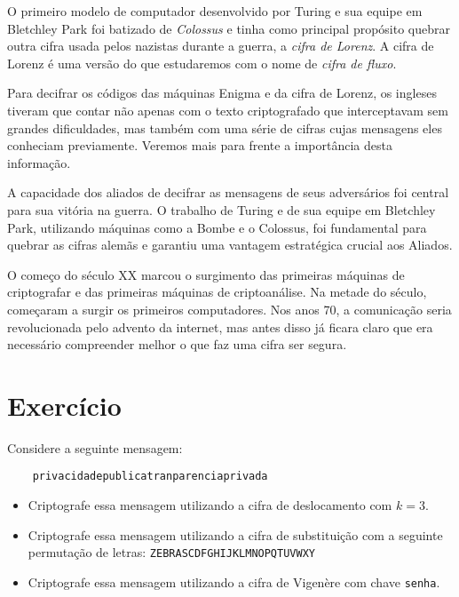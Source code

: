O primeiro modelo de computador desenvolvido por Turing e sua equipe em Bletchley Park foi batizado de {\em Colossus} e tinha como principal propósito quebrar outra cifra usada pelos nazistas durante a guerra, a {\em cifra de Lorenz}.
A cifra de Lorenz é uma versão do que estudaremos com o nome de {\em cifra de fluxo}.

Para decifrar os códigos das máquinas Enigma e da cifra de Lorenz, os ingleses tiveram que contar não apenas com o texto criptografado que interceptavam sem grandes dificuldades, mas também com uma série de cifras cujas mensagens eles conheciam previamente.
Veremos mais para frente a importância desta informação.

A capacidade dos aliados de decifrar as mensagens de seus adversários foi central para sua vitória na guerra.
O trabalho de Turing e de sua equipe em Bletchley Park, utilizando máquinas como a Bombe e o Colossus, foi fundamental para quebrar as cifras alemãs e garantiu uma vantagem estratégica crucial aos Aliados.

O começo do século XX marcou o surgimento das primeiras máquinas de criptografar e das primeiras máquinas de criptoanálise.
Na metade do século, começaram a surgir os primeiros computadores.
Nos anos 70, a comunicação seria revolucionada pelo advento da internet, mas antes disso já ficara claro que era necessário compreender melhor o que faz uma cifra ser segura.

\section{Exercício}
\label{sec:exercicio}

\begin{exercicio}
  Considere a seguinte mensagem:
  \begin{verbatim}
    privacidadepublicatranparenciaprivada
  \end{verbatim}
  \begin{itemize}
  \item Criptografe essa mensagem utilizando a cifra de deslocamento com $k = 3$.
  \item Criptografe essa mensagem utilizando a cifra de substituição com a seguinte permutação de letras: {\tt ZEBRASCDFGHIJKLMNOPQTUVWXY}
  \item Criptografe essa mensagem utilizando a cifra de Vigenère com chave {\tt senha}.
  \end{itemize}
\end{exercicio}

